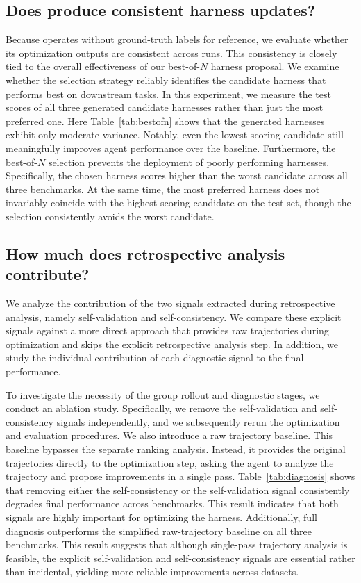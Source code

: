 \subsection{Does \method{} produce consistent harness updates?}
\label{sec:disc-consistency}

Because \method{} operates without ground-truth labels for reference, we evaluate whether its optimization outputs are consistent across runs.
This consistency is closely tied to the overall effectiveness of our best-of-$N$ harness proposal.
We examine whether the selection strategy reliably identifies the candidate harness that performs best on downstream tasks.
In this experiment, we measure the test scores of all three generated candidate harnesses rather than just the most preferred one.
Here Table~\ref{tab:bestofn} shows that the generated harnesses exhibit only moderate variance.
Notably, even the lowest-scoring candidate still meaningfully improves agent performance over the baseline.
Furthermore, the best-of-$N$ selection prevents the deployment of poorly performing harnesses.
Specifically, the chosen harness scores higher than the worst candidate across all three benchmarks.
At the same time, the most preferred harness does not invariably coincide with the highest-scoring candidate on the test set, though the selection consistently avoids the worst candidate.



\subsection{How much does retrospective analysis contribute?}
\label{sec:disc-diagnosis}

We analyze the contribution of the two signals extracted during retrospective analysis, namely self-validation and self-consistency.
We compare these explicit signals against a more direct approach that provides raw trajectories during optimization and skips the explicit retrospective analysis step.
In addition, we study the individual contribution of each diagnostic signal to the final performance.

To investigate the necessity of the group rollout and diagnostic stages, we conduct an ablation study.
Specifically, we remove the self-validation and self-consistency signals independently, and we subsequently rerun the optimization and evaluation procedures.
We also introduce a raw trajectory baseline.
This baseline bypasses the separate ranking analysis. Instead, it provides the original trajectories directly to the optimization step, asking the agent to analyze the trajectory and propose improvements in a single pass.
Table~\ref{tab:diagnosis} shows that removing either the self-consistency or the self-validation signal consistently degrades final performance across benchmarks.
This result indicates that both signals are highly important for optimizing the harness.
Additionally, full diagnosis outperforms the simplified raw-trajectory baseline on all three benchmarks.
This result suggests that although single-pass trajectory analysis is feasible, the explicit self-validation and self-consistency signals are essential rather than incidental, yielding more reliable improvements across datasets.

